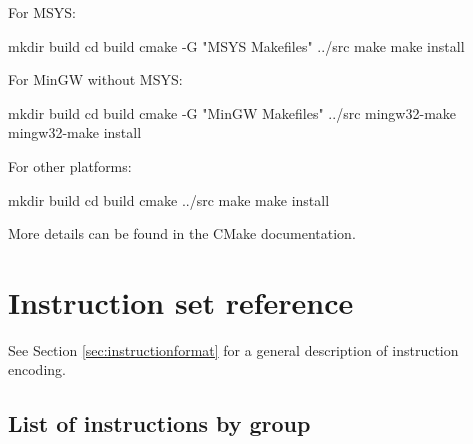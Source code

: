 \documentclass[a4paper,12pt,twoside,extrafontsizes]{memoir}
\begin{document}
For MSYS:

\begin{codepar}
    mkdir build
    cd build
    cmake -G "MSYS Makefiles" ../src
    make
    make install
\end{codepar}

For MinGW without MSYS:

\begin{codepar}
    mkdir build
    cd build
    cmake -G "MinGW Makefiles" ../src
    mingw32-make
    mingw32-make install
\end{codepar}

For other platforms:

\begin{codepar}
    mkdir build
    cd build
    cmake ../src
    make
    make install
\end{codepar}

More details can be found in the CMake documentation.

\appendix

\chapter{Instruction set reference}
\label{app:instructionset}

See Section \ref{sec:instructionformat} for a general description of \lxp{} instruction encoding.

\section{List of instructions by group}
\end{document}
